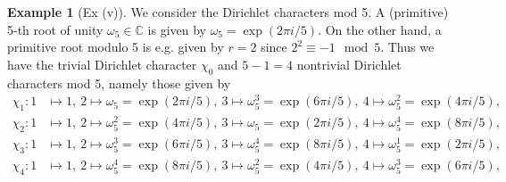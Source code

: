 \documentclass{scrartcl}
\newcommand{\C}{\mathbb{C}}
\theoremstyle{definition}
\newtheorem{example}[definition]{Example}
\begin{document}
\begin{example}[Ex (v)]
    \label{ex:nontrivial_dirichlet_characters_mod_5}
    We consider the Dirichlet characters mod 5.
    A (primitive) 5-th root of unity $\omega_5 \in \C$ is given by $\omega_5 = \exp(2\pi i/5)$.
    On the other hand, a primitive root modulo 5 is e.g. given by $r = 2$ since $2^2 \equiv -1 \mod 5$.
    Thus we have the trivial Dirichlet character $\chi_0$ and $5 - 1 = 4$ nontrivial Dirichlet characters mod 5, namely those given by
    \begin{align*}
        \chi_1: 1 &\mapsto 1,\ 2 \mapsto \omega_5 = \exp(2\pi i/5),\ 3 \mapsto \omega_5^3 = \exp(6\pi i/5),\ 4 \mapsto \omega_5^2 = \exp(4\pi i/5),\ \\
        \chi_2: 1 &\mapsto 1,\ 2 \mapsto \omega_5^2 = \exp(4\pi i/5),\ 3 \mapsto \omega_5 = \exp(2\pi i/5),\ 4 \mapsto \omega_5^4 = \exp(8\pi i/5),\ \\
        \chi_3: 1 &\mapsto 1,\ 2 \mapsto \omega_5^3 = \exp(6\pi i/5),\ 3 \mapsto \omega_5^4 = \exp(8\pi i/5),\ 4 \mapsto \omega_5^1 = \exp(2\pi i/5),\ \\
        \chi_4: 1 &\mapsto 1,\ 2 \mapsto \omega_5^4 = \exp(8\pi i/5),\ 3 \mapsto \omega_5^2 = \exp(4\pi i/5),\ 4 \mapsto \omega_5^3 = \exp(6\pi i/5),\ \\
    \end{align*}
\end{example}
\end{document}
